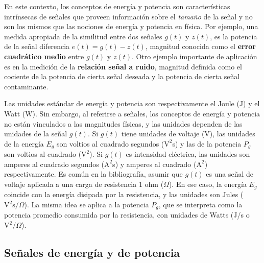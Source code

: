 \documentclass[a4paper]{article}
\begin{document}
En este contexto, los conceptos de energía y potencia son características intrínsecas de señales que proveen información sobre el \emph{tamaño} de la señal y no son los mismos que las nociones de energía y potencia en física. Por ejemplo, una medida apropiada de la similitud entre dos señales \(g(t)\) y \(z(t)\), es la potencia de la señal diferencia \(e(t)=g(t)-z(t)\), magnitud conocida como el \textbf{error cuadrático medio} entre \(g(t)\) y \(z(t)\). Otro ejemplo importante de aplicación es en la medición de la \textbf{relación señal a ruido}, magnitud definida como el cociente de la potencia de cierta señal deseada y la potencia de cierta señal contaminante.

Las unidades estándar de energía y potencia son respectivamente el Joule (J) y el Watt (W). Sin embargo, al referirse a señales, los conceptos de energía y potencia no están vinculados a las magnitudes físicas, y las unidades dependen de las unidades de la señal \(g(t)\). Si \(g(t)\) tiene unidades de voltaje (V), las unidades de la energía \(E_g\) son voltios al cuadrado segundos (\(\textrm{V}^2\)s) y las de la potencia \(P_g\) son voltios al cuadrado  (\(\textrm{V}^2\)). Si \(g(t)\) es intensidad eléctrica, las unidades son amperes al cuadrado segundos (\(\textrm{A}^2\)s) y amperes al cuadrado (\(\textrm{A}^2\)) respectivamente. Es común en la bibliografía, asumir que \(g(t)\) es una señal de voltaje aplicada a una carga de resistencia 1 ohm (\(\Omega\)). En ese caso, la energía \(E_g\) coincide con la energía disipada por la resistencia, y las unidades son Jules (\(\textrm{V}^2\textrm{s}/\Omega\)). La misma idea se aplica a la potencia \(P_g\), que se interpreta como la potencia promedio consumida por la resistencia, con unidades de Watts (J/s o \(\textrm{V}^2/\Omega\)).

\subsection{Señales de energía y de potencia}
\end{document}
